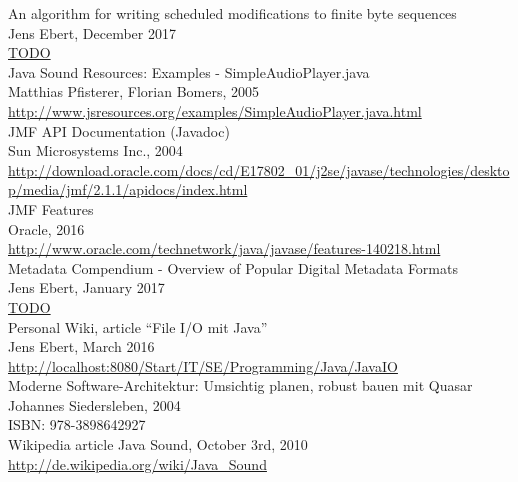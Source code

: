 \begin{thebibliography}{9999999999999}

	 An algorithm for writing scheduled modifications to finite byte sequences \\
	Jens Ebert, December 2017\\
	\url{TODO}\\

	 Java Sound Resources: Examples - SimpleAudioPlayer.java\\
	Matthias Pfisterer, Florian Bomers, 2005\\
	\url{http://www.jsresources.org/examples/SimpleAudioPlayer.java.html}\\

	 JMF API Documentation (Javadoc)\\
	Sun Microsystems Inc., 2004\\
	\url{http://download.oracle.com/docs/cd/E17802_01/j2se/javase/technologies/desktop/media/jmf/2.1.1/apidocs/index.html}\\

	 JMF Features \\
	Oracle, 2016\\
	\url{http://www.oracle.com/technetwork/java/javase/features-140218.html}\\

	 Metadata Compendium - Overview of Popular Digital Metadata Formats\\
	Jens Ebert, January 2017\\
	\url{TODO}\\
	
	 Personal Wiki, article ``File I/O mit Java''\\
	Jens Ebert, March 2016\\
	\url{http://localhost:8080/Start/IT/SE/Programming/Java/JavaIO}\\
	
	 Moderne Software-Architektur: Umsichtig planen, robust bauen mit Quasar\\
	Johannes Siedersleben, 2004\\
	ISBN: 978-3898642927\\

	 Wikipedia article Java Sound, October 3rd, 2010\\
	\url{http://de.wikipedia.org/wiki/Java_Sound}\\
	

\end{thebibliography}
